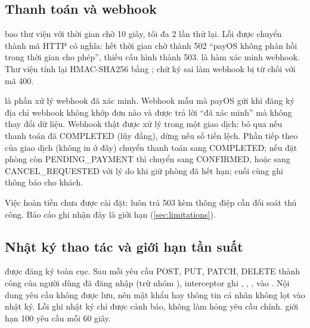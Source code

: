 \subsection{Thanh toán và webhook}\label{sec:impl-payment}

 bao thư viện  \cite{payosnode} với thời gian chờ 10 giây, tối đa 2 lần thử lại. Lỗi được chuyển thành mã HTTP có nghĩa: hết thời gian chờ thành 502 ``payOS không phản hồi trong thời gian cho phép'', thiếu cấu hình thành 503.  là hàm xác minh webhook. Thư viện tính lại HMAC-SHA256 bằng ; chữ ký sai làm webhook bị từ chối với mã 400.



 là phần xử lý webhook đã xác minh. Webhook mẫu mà payOS gửi khi đăng ký địa chỉ webhook không khớp đơn nào và được trả lời ``đã xác minh'' mà không thay đổi dữ liệu. Webhook thật được xử lý trong một giao dịch: bỏ qua nếu thanh toán đã COMPLETED (lũy đẳng), dừng nếu số tiền lệch. Phần tiếp theo của giao dịch (không in ở đây) chuyển thanh toán sang COMPLETED; nếu đặt phòng còn PENDING\_PAYMENT thì chuyển sang CONFIRMED, hoặc sang CANCEL\_REQUESTED với lý do  khi giữ phòng đã hết hạn; cuối cùng ghi thông báo cho khách.



Việc hoàn tiền chưa được cài đặt:  luôn trả 503 kèm thông điệp cần đối soát thủ công. Báo cáo ghi nhận đây là giới hạn (\cref{sec:limitations}).

\subsection{Nhật ký thao tác và giới hạn tần suất}

 được đăng ký toàn cục. Sau mỗi yêu cầu POST, PUT, PATCH, DELETE thành công của người dùng đã đăng nhập (trừ nhóm ), interceptor ghi , , ,  vào . Nội dung yêu cầu không được lưu, nên mật khẩu hay thông tin cá nhân không lọt vào nhật ký. Lỗi ghi nhật ký chỉ được cảnh báo, không làm hỏng yêu cầu chính.  giới hạn 100 yêu cầu mỗi 60 giây.

